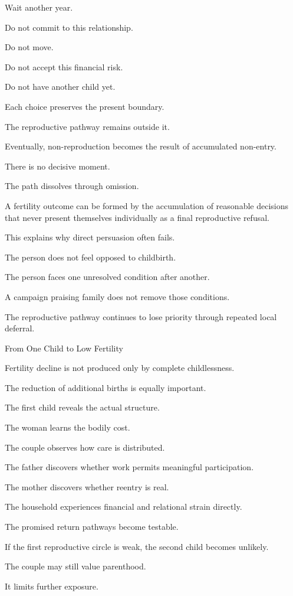 Wait another year.

Do not commit to this relationship.

Do not move.

Do not accept this financial risk.

Do not have another child yet.

Each choice preserves the present boundary.

The reproductive pathway remains outside it.

Eventually, non-reproduction becomes the result of accumulated non-entry.

There is no decisive moment.

The path dissolves through omission.

A fertility outcome can be formed by the accumulation of reasonable decisions that never present themselves individually as a final reproductive refusal.

This explains why direct persuasion often fails.

The person does not feel opposed to childbirth.

The person faces one unresolved condition after another.

A campaign praising family does not remove those conditions.

The reproductive pathway continues to lose priority through repeated local deferral.

From One Child to Low Fertility

Fertility decline is not produced only by complete childlessness.

The reduction of additional births is equally important.

The first child reveals the actual structure.

The woman learns the bodily cost.

The couple observes how care is distributed.

The father discovers whether work permits meaningful participation.

The mother discovers whether reentry is real.

The household experiences financial and relational strain directly.

The promised return pathways become testable.

If the first reproductive circle is weak, the second child becomes unlikely.

The couple may still value parenthood.

It limits further exposure.

